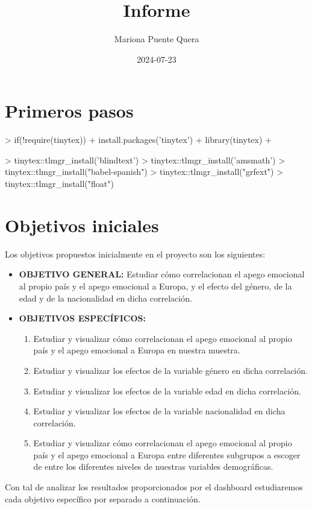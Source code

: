 \documentclass{article}
\title{Informe}
\author{Mariona Puente Quera}
\date{2024-07-23}
\begin{document}
\maketitle

\section*{Primeros pasos}
\begin{Schunk}
\begin{Sinput}
> if(!require(tinytex)){
+   install.packages('tinytex')
+   library(tinytex)
+ }
\end{Sinput}
\end{Schunk}

\begin{Schunk}
\begin{Sinput}
> tinytex::tlmgr_install('blindtext')
> tinytex::tlmgr_install('amsmath')
> tinytex::tlmgr_install("babel-spanish")
> tinytex::tlmgr_install("grfext")
> tinytex::tlmgr_install("float")
\end{Sinput}
\end{Schunk}

\section*{Objetivos iniciales}
Los objetivos propuestos inicialmente en el proyecto son los siguientes:

\begin{itemize}
    \item \textbf{OBJETIVO GENERAL:} Estudiar cómo correlacionan el apego emocional al propio país y el apego emocional a Europa, y el efecto del género, de la edad y de la nacionalidad en dicha correlación.
    \item \textbf{OBJETIVOS ESPECÍFICOS:}
    \begin{enumerate}
        \item Estudiar y visualizar cómo correlacionan el apego emocional al propio país y el apego emocional a Europa en nuestra muestra.
        \item Estudiar y visualizar los efectos de la variable género en dicha correlación.
        \item Estudiar y visualizar los efectos de la variable edad en dicha correlación.
        \item Estudiar y visualizar los efectos de la variable nacionalidad en dicha correlación.
        \item Estudiar y visualizar cómo correlacionan el apego emocional al propio país y el apego emocional a Europa entre diferentes subgrupos a escoger de entre los diferentes niveles de nuestras variables demográficas.
    \end{enumerate}
\end{itemize}
Con tal de analizar los resultados proporcionados por el dashboard estudiaremos cada objetivo específico por separado a continuación.
\end{document}
